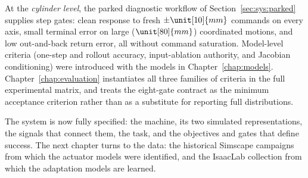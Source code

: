 At the \emph{cylinder level}, the parked diagnostic workflow of
Section~\ref{sec:sys:parked} supplies step gates: clean response to
fresh $\pm\unit[10]{mm}$ commands on every axis, small terminal error on
large ($\unit[80]{mm}$) coordinated motions, and low out-and-back return
error, all without command saturation. Model-level criteria
(one-step and rollout accuracy, input-ablation authority, and Jacobian
conditioning) were introduced with the models in
Chapter~\ref{chap:models}. Chapter~\ref{chap:evaluation} instantiates
all three families of criteria in the full experimental matrix, and
treats the eight-gate contract as the minimum acceptance criterion
rather than as a substitute for reporting full distributions.

The system is now fully specified: the machine, its two simulated
representations, the signals that connect them, the task, and the
objectives and gates that define success. The next chapter turns to the
data: the historical Simscape campaigns from which the actuator models
were identified, and the IsaacLab collection from which the adaptation
models are learned.
